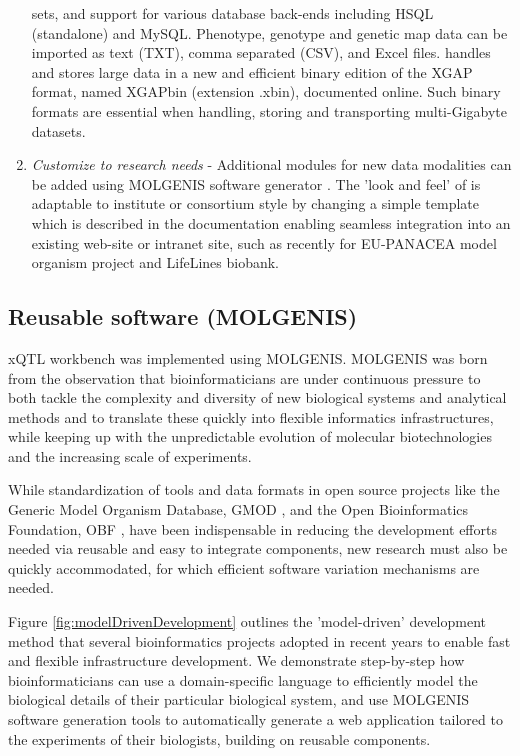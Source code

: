 \begin{enumerate}
sets, and support for various database back-ends including HSQL (standalone) and MySQL. Phenotype, 
genotype and genetic map data can be imported as text (TXT), comma separated (CSV), and Excel files. 
\xqtlwb handles and stores large data in a new and efficient binary edition of the XGAP format, named 
XGAPbin (extension .xbin), documented online. Such binary formats are essential when handling, storing 
and transporting multi-Gigabyte datasets.
\item \emph{Customize to research needs} - Additional modules for new data modalities can be added using 
MOLGENIS software generator \cite{Swertz:2010b}. The 'look and feel' of \xqtlwb is adaptable to 
institute or consortium style by changing a simple template which is described in the \xqtlwb 
documentation enabling seamless integration into an existing web-site or intranet site, such as 
recently for EU-PANACEA model organism project and LifeLines biobank.
\end{enumerate}

\subsection{Reusable software (MOLGENIS)}
xQTL workbench was implemented using MOLGENIS. MOLGENIS was born from the observation that bioinformaticians 
are under continuous pressure to both tackle the complexity and diversity of new biological systems and 
analytical methods and to translate these quickly into flexible informatics infrastructures, while keeping 
up with the unpredictable evolution of molecular biotechnologies and the increasing scale of experiments.

While standardization of tools and data formats in open source projects like the Generic Model Organism 
Database, GMOD \cite{OConnor:2008}, and the Open Bioinformatics Foundation, OBF \cite{OBF:2010:Online}, have 
been indispensable in reducing the development efforts needed via reusable and easy to integrate components, 
new research must also be quickly accommodated, for which efficient software variation mechanisms are needed.

Figure \ref{fig:modelDrivenDevelopment} outlines the 'model-driven' development method that several 
bioinformatics projects adopted in recent years to enable fast and flexible infrastructure development. 
We demonstrate step-by-step how bioinformaticians can use a domain-specific language to efficiently model 
the biological details of their particular biological system, and use MOLGENIS software generation tools to 
automatically generate a web application tailored to the experiments of their biologists, building on reusable components. 

